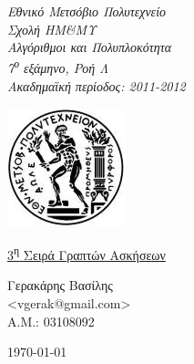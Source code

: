\begin{titlepage}
\begin{center}

\noindent\begin{minipage}[b]{.55\textwidth}
\begin{Large}
\emph{Εθνικό Μετσόβιο Πολυτεχνείο\\
Σχολή ΗΜ\&ΜΥ\\
Αλγόριθμοι και Πολυπλοκότητα\\
7\textsuperscript{ο} εξάμηνο, Ροή Λ\\
Ακαδημαϊκή περίοδος: 2011-2012\\}
\end{Large}
\end{minipage}%
\begin{minipage}[b]{.45\textwidth}
     \centering
     \includegraphics[scale=0.8]{title/ntua_logo}
\end{minipage}

\vspace{5cm}
\begin{huge}
\underline{3\textsuperscript{η} Σειρά Γραπτών Ασκήσεων}
\end{huge}
\vfill

\begin{flushright}
\Large{Γερακάρης Βασίλης}\\
\large{<vgerak@gmail.com> }\\
\large{Α.Μ.: 03108092}\\
\end{flushright}
\vspace{1cm}

\large\today\\
\end{center}
\end{titlepage}

